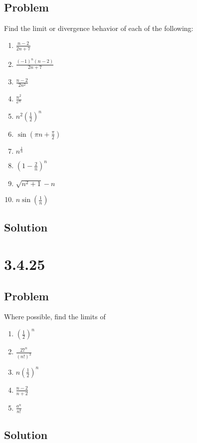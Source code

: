 \documentclass[12pt]{article}
\newcommand{\round}[1]{\left(       #1 \right)      }
\begin{document}
\subsection*{Problem}
Find the limit or divergence behavior of each of the following:
\begin{enumerate}
    \item $\frac{n - 2}{2n + 7}$
    \item $\frac{(-1)^n (n - 2)}{2n + 7}$
    \item $\frac{n - 2}{2n^2}$
    \item $\frac{n^2}{e^{n}}$
    \item $n^2 \round{\frac{1}{2}}^n$
    \item $\sin(\pi n + \frac{\pi}{2})$
    \item $n^\frac{1}{n}$
    \item $\round{1 - \frac{2}{n}}^n$
    \item $\sqrt{n^2 + 1} - n$
    \item $n \sin\round{\frac{1}{n}}$
\end{enumerate}

\subsection*{Solution}



\section*{3.4.25}

\subsection*{Problem}
Where possible, find the limits of
\begin{enumerate}
    \item $\round{\frac{1}{2}}^n$
    \item $\frac{27^n}{(n!)^3}$
    \item $n \round{\frac{1}{2}}^n$
    \item $\frac{n - 2}{n + 2}$
    \item $\frac{a^n}{n!}$
\end{enumerate}

\subsection*{Solution}
\end{document}

